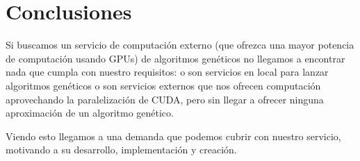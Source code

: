 \bigskip
\section{Conclusiones}
\bigskip

Si buscamos un servicio de computación externo (que ofrezca una mayor potencia de computación usando GPUs) de algoritmos genéticos no llegamos a encontrar nada que cumpla con nuestro requisitos: o son servicios en local para lanzar algoritmos genéticos o son servicios externos que nos ofrecen computación aprovechando la paralelización de CUDA, pero sin llegar a ofrecer ninguna aproximación de un algoritmo genético.

Viendo esto llegamos a una demanda que podemos cubrir con nuestro servicio, motivando a su desarrollo, implementación y creación.







